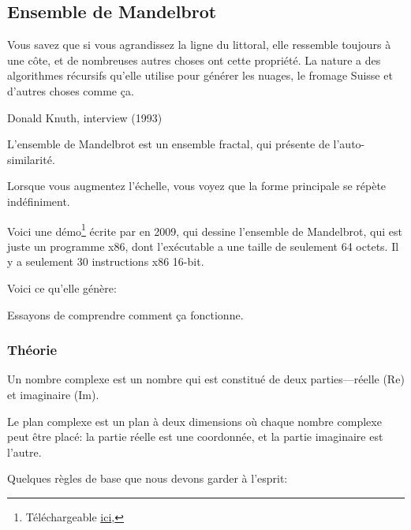 \clearpage
\subsection{Ensemble de Mandelbrot}
\label{Mandelbrot_demo}

\epigraph{Vous savez que si vous agrandissez la ligne du littoral, elle ressemble
toujours à une côte, et de nombreuses autres choses ont cette propriété. La nature
a des algorithmes récursifs qu'elle utilise pour générer les nuages, le fromage
Suisse et d'autres choses comme ça.}
{Donald Knuth, interview (1993)}

L'ensemble de Mandelbrot est un ensemble fractal, qui présente de l'auto-similarité.

Lorsque vous augmentez l'échelle, vous voyez que la forme principale se répète indéfiniment.

Voici une démo\footnote{Téléchargeable \href{http://www.pouet.net/prod.php?which=53287} {ici},}
écrite par  en 2009, qui dessine l'ensemble de Mandelbrot, qui est
juste un programme x86, dont l'exécutable a une taille de seulement 64 octets.
Il y a seulement 30 instructions x86 16-bit.

Voici ce qu'elle génère:

\begin{figure}[H]
\centering
{}
\end{figure}

Essayons de comprendre comment ça fonctionne.

\subsubsection{Théorie}


Un nombre complexe est un nombre qui est constitué de deux parties---réelle (Re) et
imaginaire (Im).


Le plan complexe est un plan à deux dimensions où chaque nombre complexe peut être
placé: la partie réelle est une coordonnée, et la partie imaginaire est l'autre.

Quelques règles de base que nous devons garder à l'esprit:

